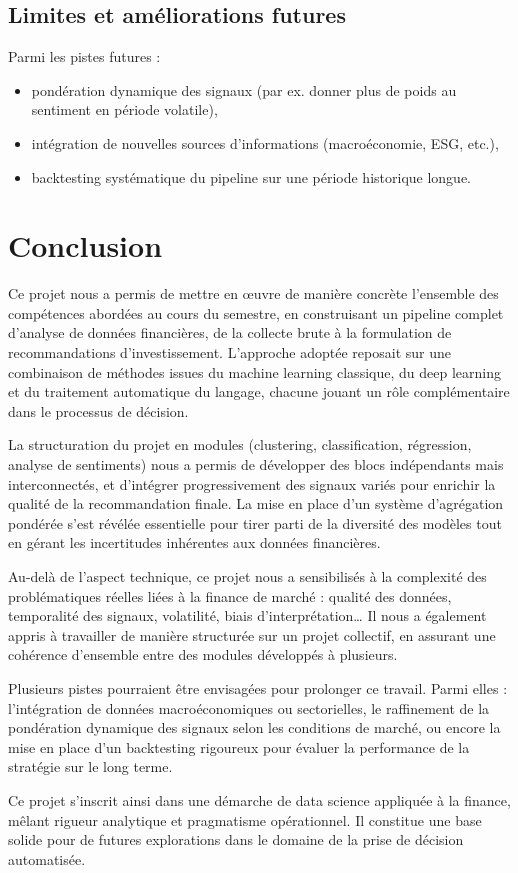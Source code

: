 \documentclass[a4paper,12pt]{article}
\begin{document}
\subsection*{Limites et améliorations futures}

Parmi les pistes futures :
\begin{itemize}
    \item pondération dynamique des signaux (par ex. donner plus de poids au sentiment en période volatile),
    \item intégration de nouvelles sources d’informations (macroéconomie, ESG, etc.),
    \item backtesting systématique du pipeline sur une période historique longue.
\end{itemize}

\section{Conclusion}

Ce projet nous a permis de mettre en œuvre de manière concrète l’ensemble des compétences abordées au cours du semestre, en construisant un pipeline complet d’analyse de données financières, de la collecte brute à la formulation de recommandations d’investissement. L’approche adoptée reposait sur une combinaison de méthodes issues du machine learning classique, du deep learning et du traitement automatique du langage, chacune jouant un rôle complémentaire dans le processus de décision.

La structuration du projet en modules (clustering, classification, régression, analyse de sentiments) nous a permis de développer des blocs indépendants mais interconnectés, et d’intégrer progressivement des signaux variés pour enrichir la qualité de la recommandation finale. La mise en place d’un système d’agrégation pondérée s’est révélée essentielle pour tirer parti de la diversité des modèles tout en gérant les incertitudes inhérentes aux données financières.

Au-delà de l’aspect technique, ce projet nous a sensibilisés à la complexité des problématiques réelles liées à la finance de marché : qualité des données, temporalité des signaux, volatilité, biais d’interprétation… Il nous a également appris à travailler de manière structurée sur un projet collectif, en assurant une cohérence d’ensemble entre des modules développés à plusieurs.

Plusieurs pistes pourraient être envisagées pour prolonger ce travail. Parmi elles : l’intégration de données macroéconomiques ou sectorielles, le raffinement de la pondération dynamique des signaux selon les conditions de marché, ou encore la mise en place d’un backtesting rigoureux pour évaluer la performance de la stratégie sur le long terme.

Ce projet s’inscrit ainsi dans une démarche de data science appliquée à la finance, mêlant rigueur analytique et pragmatisme opérationnel. Il constitue une base solide pour de futures explorations dans le domaine de la prise de décision automatisée.

\printbibliography
\end{document}
